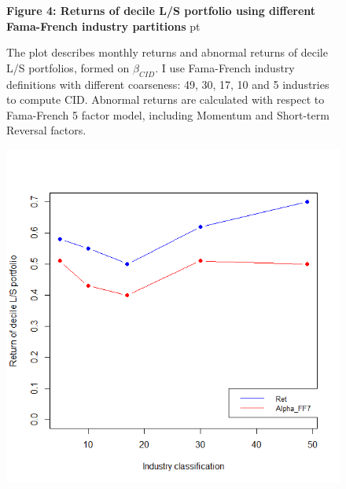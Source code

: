 \documentclass[16pt]{article}
\begin{document}
\begin{figure}
\textbf{Figure 4: Returns of decile L/S portfolio using different Fama-French industry partitions}
 pt
\begin{flushleft}
{The plot describes monthly returns and abnormal returns of decile L/S portfolios, formed on $\beta_{CID}$. I use Fama-French industry definitions with different coarseness: 49, 30, 17, 10 and 5 industries to compute CID. Abnormal returns are calculated with respect to Fama-French 5 factor model, including Momentum and Short-term Reversal factors.}
\end{flushleft}
\centering
\includegraphics[width=1\textwidth]{alphas_inds.png}
\end{figure}


\clearpage
\end{document}

